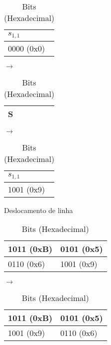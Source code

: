 \documentclass[
    article,            %
    11pt,               %
    oneside,            %
    a4paper,            %
    english,            %
    brazil,             %
    sumario=tradicional,
    ]{abntex2}
\begin{document}
\begin{table}[H]
\begin{tabular}{|l|}
\hline
$s_{1,1}$  \\ \hline
0000 (0x0)      \\ \hline
\end{tabular}
$\longrightarrow$
\begin{tabular}{|l|}
\hline
S  \\ \hline
\end{tabular}
$\longrightarrow$
\begin{tabular}{|l|}
\hline
$s_{1,1}$  \\ \hline
1001 (0x9)       \\ \hline
\end{tabular}

\caption*{Bits (Hexadecimal)}
\end{table}

\label{subsubsub:deslocar-linha-round1}

\begin{table}[H]
\centering
\caption{Deslocamento de linha}
\label{tabela-desloc-linha}
\begin{tabular}{|l|l|}
\hline
1011 (0xB) & 0101 (0x5) \\ \hline
0110 (0x6) & 1001 (0x9) \\ \hline
\end{tabular}
$\longrightarrow$
\begin{tabular}{|l|l|}
\hline
1011 (0xB) & 0101 (0x5) \\ \hline
1001 (0x9) & 0110 (0x6) \\ \hline
\end{tabular}
\caption*{Bits (Hexadecimal)}
\end{table}

\label{subsubsub:misturar-coluna-round1}
\end{document}
